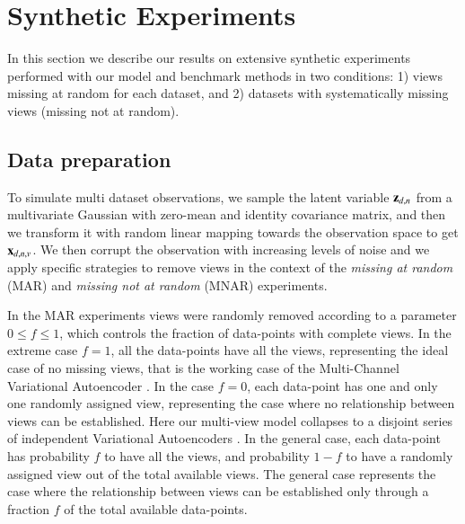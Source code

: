 \section{Synthetic Experiments}
\label{sec:synth}

In this section we describe our results on extensive synthetic experiments performed with our model and benchmark methods in two conditions:
1) views missing at random for each dataset,
and 2) datasets with systematically missing views (missing not at random).

\subsection{Data preparation}

To simulate multi dataset observations, we sample the latent variable $\mathbf{z}_{d,n}$ from a multivariate Gaussian with zero-mean and identity covariance matrix, and then we transform it with random linear mapping towards the observation space to get $\mathbf{x}_{d,n,v}$.
We then corrupt the observation with increasing levels of noise
and we apply specific strategies to remove views in the context of the \textit{missing at random} (MAR) and \textit{missing not at random} (MNAR) experiments.

In the MAR experiments views were randomly removed according to a parameter $0 \leq f \leq 1$, which controls the fraction of data-points with complete views.
In the extreme case $f=1$, all the data-points have all the views, representing the ideal case of no missing views, that is the working case of the Multi-Channel Variational Autoencoder \citep{Antelmi2019}.
In the case $f=0$, each data-point has one and only one randomly assigned view, representing the case where no relationship between views can be established.
Here our multi-view model collapses to a disjoint series of independent Variational Autoencoders \citep{Kingma2013, Rezende2014}.
In the general case, each data-point has probability $f$ to have all the views, and probability $1-f$ to have a randomly assigned view out of the total available views.
The general case represents the case where the relationship between views can be established only through a fraction $f$ of the total available data-points.

